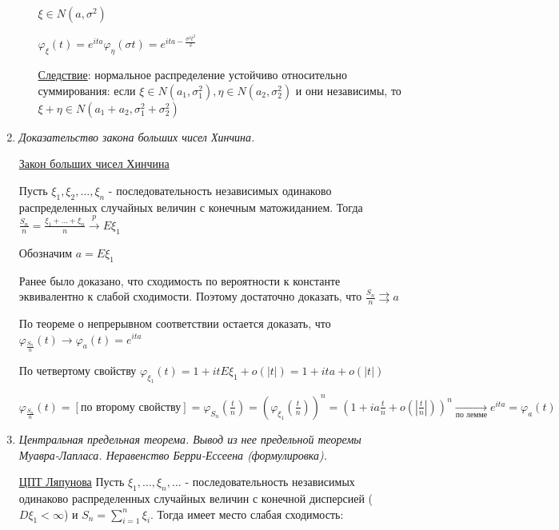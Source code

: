 \documentclass[12pt]{article}
\begin{document}
\begin{enumerate}
\begin{itemize}
        $\xi \in N(a, \sigma^2)$

        $\varphi_\xi(t) = e^{ita} \varphi_\eta(\sigma t) = e^{ita - \frac{\sigma^2t^2}{2}}$

        \underline{Следствие}: нормальное распределение устойчиво относительно суммирования: если $\xi \in N(a_1, \sigma_1^2), \eta \in N(a_2, \sigma^2_2)$ и они независимы, то $\xi + \eta \in N(a_1 + a_2, \sigma_1^2 + \sigma_2^2)$

    \end{itemize}

    \item \textit{Доказательство закона больших чисел Хинчина.}

    \hyperlink{lawofbignumberskhinchin2}{Закон больших чисел Хинчина}
    
    Пусть $\xi_1, \xi_2, \dots, \xi_n$ - последовательность независимых одинаково распределенных случайных величин с конечным матожиданием.
    Тогда $\frac{S_n}{n} = \frac{\xi_1 + \dots + \xi_n}{n} \overset{p}{\longrightarrow} E\xi_1$
    
    \begin{MyProof}
        Обозначим $a = E\xi_1$
    
        Ранее было доказано, что сходимость по вероятности к константе эквивалентно к слабой сходимости. Поэтому достаточно доказать, что $\frac{S_n}{n} \rightrightarrows a$
    
        По теореме о непрерывном соответствии остается доказать, что $\varphi_{\frac{S_n}{n}}(t) \longrightarrow \varphi_a(t) = e^{ita}$
    
        По четвертому свойству $\varphi_{\xi_1}(t) = 1 + itE\xi_1 + o(|t|) = 1 + ita + o(|t|)$
    
        $\varphi_{\frac{S_n}{n}}(t) = [\text{по второму свойству}] = \varphi_{S_n}\left(\frac{t}{n}\right) = \left(\varphi_{\xi_1}\left(\frac{t}{n}\right)\right)^n = \left(1 + ia\frac{t}{n} + o\left(\left|\frac{t}{n}\right|\right)\right)^n \underset{\text{по лемме}}{\longrightarrow}
        e^{ita} = \varphi_a(t)$
    \end{MyProof}

    \item \textit{Центральная предельная теорема. Вывод из нее предельной теоремы Муавра-Лапласа. Неравенство Берри-Ессеена (формулировка). }

    \hyperlink{centrallimittheorem}{ЦПТ Ляпунова} \Ths Пусть $\xi_1, \dots, \xi_n, \dots$ - последовательность независимых одинаково распределенных случайных величин
    с конечной дисперсией ($D\xi_1 < \infty$) и $S_n = \sum_{i = 1}^n \xi_i$. Тогда имеет место слабая сходимость:


\end{enumerate}
\end{document}
